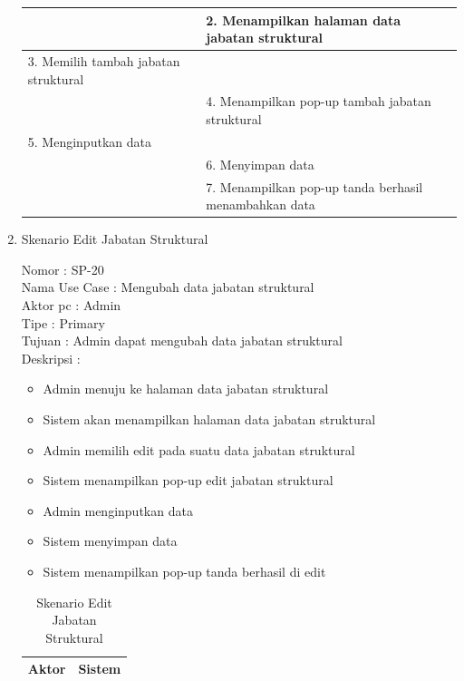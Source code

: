 \begin{enumerate}
\begin{table}
\begin{tabular}{ | p{55mm} | p{70mm} |}
		\hline
		
		&  2.	Menampilkan halaman data jabatan struktural\\
		
		\hline
		
		3. Memilih tambah jabatan struktural& \\
		
		\hline
		
		& 4.	Menampilkan pop-up tambah jabatan struktural\\
		
		\hline
		
		5.	Menginputkan data  & \\
		\hline
		
		& 6.	Menyimpan data \\
		\hline
		
		& 7.	Menampilkan pop-up tanda berhasil menambahkan data \\
		\hline
		
	\end{tabular}
\end{table}

\item Skenario Edit Jabatan Struktural

Nomor \kern 3.6pc : SP-20 \\
Nama Use Case : Mengubah data jabatan struktural \\
Aktor  pc : Admin \\
Tipe \kern 4.6pc : Primary \\
Tujuan \kern 3.6pc : Admin dapat mengubah data jabatan struktural\\
Deskripsi \kern 2.5pc : 

\begin{itemize}
	\item Admin menuju ke halaman data jabatan struktural
	\item Sistem akan menampilkan halaman data jabatan struktural
	\item Admin memilih edit pada suatu data jabatan struktural
	\item Sistem menampilkan pop-up edit jabatan struktural
	\item Admin menginputkan data
	\item Sistem menyimpan data
	\item Sistem menampilkan pop-up tanda berhasil di edit
	
\end{itemize}

\begin{table}
	\caption{Skenario Edit Jabatan Struktural}
	\centering
	\begin{tabular}{ |p{55mm} | p{70mm} |}
		\hline 
		\textbf{Aktor} & \textbf{Sistem} \\
		\hline
		

\end{tabular}
\end{table}
\end{enumerate}
